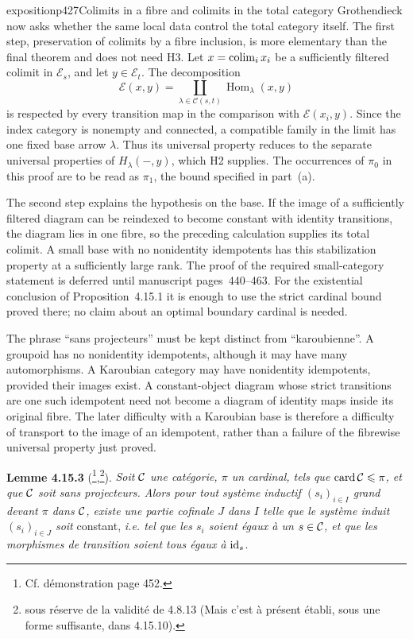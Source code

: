\begin{dcomment}{exposition}{p427}{Colimits in a fibre and colimits in the total category}
Grothendieck now asks whether the same local data control the total category itself. The first step, preservation of colimits by a fibre inclusion, is more elementary than the final theorem and does not need H3. Let $x=\mathop{\rm colim}_i x_i$ be a sufficiently filtered colimit in $\mathcal E_s$, and let $y\in\mathcal E_t$. The decomposition
\[
 \mathcal E(x,y)=
 \coprod_{\lambda\in\mathcal C(s,t)}
       \operatorname{Hom}_\lambda(x,y)
\]
is respected by every transition map in the comparison with $\mathcal E(x_i,y)$. Since the index category is nonempty and connected, a compatible family in the limit has one fixed base arrow $\lambda$. Thus its universal property reduces to the separate universal properties of $H_\lambda(-,y)$, which H2 supplies. The occurrences of $\pi_0$ in this proof are to be read as $\pi_1$, the bound specified in part~(a).

The second step explains the hypothesis on the base. If the image of a sufficiently filtered diagram can be reindexed to become constant with identity transitions, the diagram lies in one fibre, so the preceding calculation supplies its total colimit. A small base with no nonidentity idempotents has this stabilization property at a sufficiently large rank. The proof of the required small-category statement is deferred until manuscript pages~440--463. For the existential conclusion of Proposition~4.15.1 it is enough to use the strict cardinal bound proved there; no claim about an optimal boundary cardinal is needed.

The phrase ``sans projecteurs'' must be kept distinct from ``karoubienne''. A groupoid has no nonidentity idempotents, although it may have many automorphisms. A Karoubian category may have nonidentity idempotents, provided their images exist. A constant-object diagram whose strict transitions are one such idempotent need not become a diagram of identity maps inside its original fibre. The later difficulty with a Karoubian base is therefore a difficulty of transport to the image of an idempotent, rather than a failure of the fibrewise universal property just proved.
\end{dcomment}


\textbf{Lemme 4.15.3} (\footnote{Cf. démonstration page 452.},\footnote{sous réserve de la validité de 4.8.13 (Mais c'est à présent établi, sous une forme suffisante, dans 4.15.10).}). \textit{Soit $\mathcal{C}$ une catégorie, $\pi$ un cardinal, tels que} $\operatorname{card}\mathcal{C} \leqslant \pi$\textit{, et que $\mathcal{C}$ soit sans projecteurs. Alors pour tout système inductif $(s_i)_{i\in I}$ grand devant $\pi$ dans $\mathcal{C}$, existe une partie cofinale $J$ dans $I$ telle que le système induit $(s_i)_{i\in J}$ soit} constant, \textit{i.e. tel que les $s_i$ soient égaux à un $s \in \mathcal{C}$, et que les morphismes de transition soient tous égaux à} $\mathrm{id}_s$.


